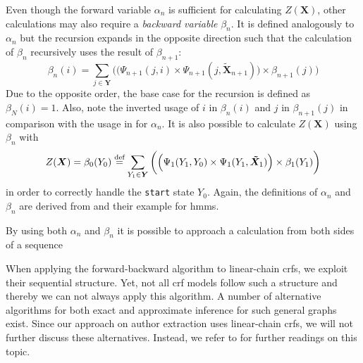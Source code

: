 Even though the forward variable $\alpha_n$ is sufficient for calculating $Z(\bm{X})$, other calculations may also require a \textit{backward variable} $\beta_n$. It is defined analogously to $\alpha_n$ but the recursion expands in the opposite direction such that the calculation of $\beta_n$ recursively uses the result of $\beta_{n+1}$:
\begin{equation}
  \label{equ:linear-chain-crf-z-beta}
  \beta_n(i) = \sum_{j\in\bm{Y}}\bigg(\Big(\Psi_{n+1}(j,i)\times\Psi_{n+1}(j,\bm{\tilde{X}}_{n+1})\Big)\times \beta_{n+1}(j)\bigg)
\end{equation}
Due to the opposite order, the base case for the recursion is defined as $\beta_N(i)=1$.
Also, note the inverted usage of $i$ in $\beta_n(i)$ and $j$ in $\beta_{n+1}(j)$ in comparison with the usage in  for $\alpha_n$.
It is also possible to calculate $Z(\bm{X})$ using $\beta_n$ with
\begin{equation}
  \label{equ:linear-chain-crf-z-beta-sum}
  Z(\bm{X})=\beta_0(Y_0)\stackrel{\text{def}}{=}\sum_{Y_1\in\bm{Y}}\bigg(\Big(\Psi_1(Y_1,Y_0)\times\Psi_1(Y_1,\bm{\tilde{X}}_1)\Big)\times\beta_1(Y_1)\bigg)
\end{equation}
in order to correctly handle the \texttt{start} state $Y_0$.
Again, the definitions of $\alpha_n$ and $\beta_n$ are derived from \citet{sutton2010introduction} and their example for \glspl{hmm}.

\bigskip

By using both $\alpha_n$ and $\beta_n$ it is possible to approach a calculation from both sides of a sequence


\bigskip

When applying the forward-backward algorithm to \glspl{linear-chain crf}, we exploit their sequential structure.
Yet, not all \gls{crf} models follow such a structure and thereby we can not always apply this algorithm.
A number of alternative algorithms for both exact and approximate inference for such general graphs exist.
Since our approach on author extraction uses \glspl{linear-chain crf}, we will not further discuss these alternatives.
Instead, we refer to \citet{koller2009probabilistic} for further readings on this topic.

